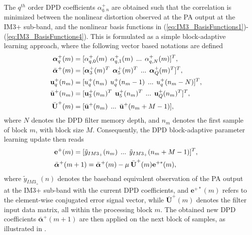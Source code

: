 \documentclass[9pt,conference]{IEEEtran}
\begin{document}
\begin{spacing}{0.88}
The $q^{th}$ order DPD coefficients $\alpha^+_{q,n}$ are obtained such that the correlation is minimized between the nonlinear distortion observed at the PA output at the IM3+ sub-band, and the nonlinear basis functions in (\ref{eq:IM3_BasisFunctions1})-(\ref{eq:IM3_BasisFunctions4}). This is formulated as a simple block-adaptive learning approach, where the following vector based notations are defined
\begin{align}
\small
\boldsymbol{\alpha}^+_q(m) &= [\alpha^+_{q,0}(m)\:\:\alpha^+_{q,1}(m)\:\: ... \:\: \alpha^+_{q,N}(m)]^T, \\
\bar{\boldsymbol{\alpha}}^+(m) &= [\boldsymbol{\alpha}^+_3(m)^T \:\: \boldsymbol{\alpha}^+_5(m)^T \:\: ... \:\: \boldsymbol{\alpha}^+_Q(m)^T]^T, \\
\textbf{u}^+_q(n_m) &= [u^+_q(n_m)\:\:u^+_q(n_m-1) \:\: ... \:\: u^+_q(n_m-N)]^T, \\
\bar{\textbf{u}}^+(n_m) &= [\textbf{u}^+_3(n_m)^T \:\: \textbf{u}^+_5(n_m)^T  \:\: ... \:\: \textbf{u}^+_Q(n_m)^T ]^T, \\
\bar{\textbf{U}}^+(m) &= [\bar{\textbf{u}}^+(n_m) \:\: ... \:\: \bar{\textbf{u}}^+(n_m+M-1)],
\end{align}
\normalsize
where $N$ denotes the DPD filter memory depth, and $n_m$ denotes the first sample of block $m$, with block size $M$.
Consequently, the DPD block-adaptive parameter learning update then reads
\begin{align}
\small
&\textbf{e}^+(m) = [\tilde{y}_{IM3_+}(n_m) \:\: ... \:\: \tilde{y}_{IM3_+}(n_m+M-1)]^T, \\
&\bar{\boldsymbol{\alpha}}^+(m+1) = \bar{\boldsymbol{\alpha}}^+(m) - \mu \: \bar{\textbf{U}}^+(m)\textbf{e}^{+*}(m), 
\label{eq:BlockAdaptive}
\end{align}
\normalsize
where $\tilde{y}_{IM3_+}(n)$ denotes the baseband equivalent observation of the PA output at the IM3+ sub-band with the current DPD coefficients, and $\textbf{e}^{+*}(m)$ refers to the element-wise conjugated error signal vector, while $\bar{\textbf{U}}^+(m)$ denotes the filter input data matrix, all within the processing block $m$. 
The obtained new DPD coefficients $\bar{\boldsymbol{\alpha}}^+(m+1)$ are then applied on the next block of samples, as illustrated in \cite{Asilomar2015}.


\end{spacing}
\end{document}
